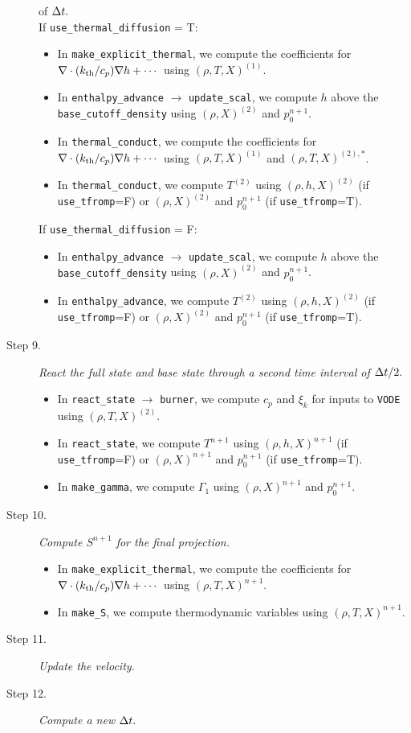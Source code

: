 \begin{description}
{of $\Delta t.$}\\
If {\tt use\_thermal\_diffusion} = T:
\begin{itemize}
\item In {\tt make\_explicit\_thermal}, we compute the coefficients for 
$\nabla\cdot(k_{\rm th}/c_p)\nabla h + \cdots$ using $(\rho,T,X)^{(1)}$.
\item In {\tt enthalpy\_advance} $\rightarrow$ {\tt update\_scal}, we compute $h$ above
the {\tt base\_cutoff\_density} using $(\rho,X)^{(2)}$ and $p_0^{n+1}$.
\item In {\tt thermal\_conduct}, we compute the coefficients for 
$\nabla\cdot(k_{\rm th}/c_p)\nabla h + \cdots$ using $(\rho,T,X)^{(1)}$ and $(\rho,T,X)^{(2),*}$.
\item In {\tt thermal\_conduct}, we compute $T^{(2)}$ using $(\rho,h,X)^{(2)}$
(if {\tt use\_tfromp}=F) or $(\rho,X)^{(2)}$ and $p_0^{n+1}$ (if {\tt use\_tfromp}=T).
\end{itemize}
If {\tt use\_thermal\_diffusion} = F:
\begin{itemize}
\item In {\tt enthalpy\_advance} $\rightarrow$ {\tt update\_scal}, we compute $h$ above
the {\tt base\_cutoff\_density} using $(\rho,X)^{(2)}$ and $p_0^{n+1}$.
\item In {\tt enthalpy\_advance}, we compute $T^{(2)}$ using $(\rho,h,X)^{(2)}$
(if {\tt use\_tfromp}=F) or $(\rho,X)^{(2)}$ and $p_0^{n+1}$ (if {\tt use\_tfromp}=T).
\end{itemize}
\item[Step 9.] {\em React the full state and base state through a second time interval 
of $\Delta t/2.$}
\begin{itemize}
\item In {\tt react\_state} $\rightarrow$ {\tt burner}, we compute $c_p$ and $\xi_k$ 
for inputs to {\tt VODE} using $(\rho,T,X)^{(2)}$.
\item In {\tt react\_state}, we compute $T^{n+1}$ using $(\rho,h,X)^{n+1}$ 
(if {\tt use\_tfromp}=F) or $(\rho,X)^{n+1}$ and $p_0^{n+1}$ (if {\tt use\_tfromp}=T).
\item In {\tt make\_gamma}, we compute $\Gamma_1$ using $(\rho,X)^{n+1}$ and $p_0^{n+1}$.
\end{itemize}
\item[Step 10.] {\em Compute $S^{n+1}$ for the final projection.}
\begin{itemize}
\item In {\tt make\_explicit\_thermal}, we compute the coefficients for 
$\nabla\cdot(k_{\rm th}/c_p)\nabla h + \cdots$ using $(\rho,T,X)^{n+1}$.
\item In {\tt make\_S}, we compute thermodynamic variables using $(\rho,T,X)^{n+1}$.
\end{itemize}
\item[Step 11.] {\em Update the velocity.}
\item[Step 12.] {\em Compute a new $\Delta t.$}
\end{description}
